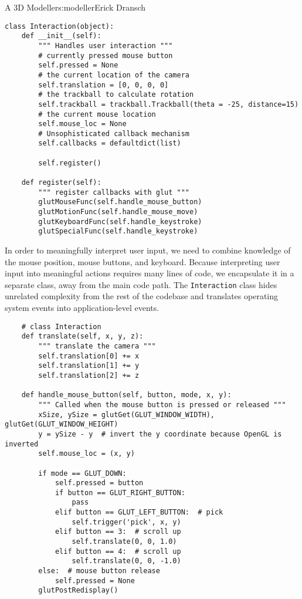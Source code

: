 \begin{aosachapter}{A 3D Modeller}{s:modeller}{Erick Dransch}
\begin{verbatim}
class Interaction(object):
    def __init__(self):
        """ Handles user interaction """
        # currently pressed mouse button
        self.pressed = None
        # the current location of the camera
        self.translation = [0, 0, 0, 0]
        # the trackball to calculate rotation
        self.trackball = trackball.Trackball(theta = -25, distance=15)
        # the current mouse location
        self.mouse_loc = None
        # Unsophisticated callback mechanism
        self.callbacks = defaultdict(list)
        
        self.register()

    def register(self):
        """ register callbacks with glut """
        glutMouseFunc(self.handle_mouse_button)
        glutMotionFunc(self.handle_mouse_move)
        glutKeyboardFunc(self.handle_keystroke)
        glutSpecialFunc(self.handle_keystroke)
\end{verbatim}

\label{operating-system-callbacks}

In order to meaningfully interpret user input, we need to combine
knowledge of the mouse position, mouse buttons, and keyboard. Because
interpreting user input into meaningful actions requires many lines of
code, we encapsulate it in a separate class, away from the main code
path. The \texttt{Interaction} class hides unrelated complexity from the
rest of the codebase and translates operating system events into
application-level events.

\begin{verbatim}
    # class Interaction 
    def translate(self, x, y, z):
        """ translate the camera """
        self.translation[0] += x
        self.translation[1] += y
        self.translation[2] += z

    def handle_mouse_button(self, button, mode, x, y):
        """ Called when the mouse button is pressed or released """
        xSize, ySize = glutGet(GLUT_WINDOW_WIDTH), glutGet(GLUT_WINDOW_HEIGHT)
        y = ySize - y  # invert the y coordinate because OpenGL is inverted
        self.mouse_loc = (x, y)

        if mode == GLUT_DOWN:
            self.pressed = button
            if button == GLUT_RIGHT_BUTTON:
                pass
            elif button == GLUT_LEFT_BUTTON:  # pick
                self.trigger('pick', x, y)
            elif button == 3:  # scroll up
                self.translate(0, 0, 1.0)
            elif button == 4:  # scroll up
                self.translate(0, 0, -1.0)
        else:  # mouse button release
            self.pressed = None
        glutPostRedisplay()


\end{verbatim}
\end{aosachapter}
